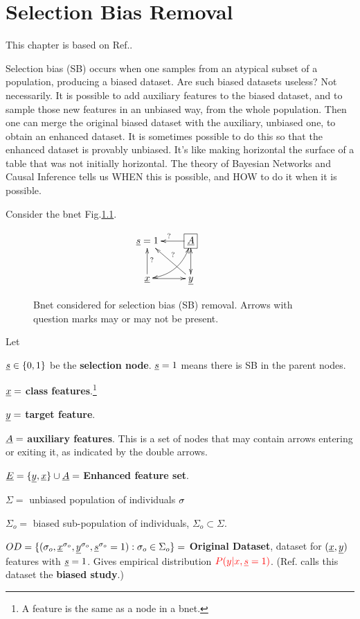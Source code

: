 \chapter{Selection Bias Removal}
\label{ch-sb-removal}
This chapter
is based on Ref.\cite{bare-sb-removal}.

Selection bias (SB)
occurs when one
samples from an
atypical subset
of a
population,
producing a biased dataset.
Are such biased
datasets
useless? Not necessarily.
It is possible to
add auxiliary features
to the biased dataset, and to
sample those new features
in an unbiased way,
 from the whole population.
Then
one can merge
the original
 biased dataset with the
auxiliary, unbiased one,
to obtain an enhanced dataset.
It is sometimes
possible to do this so that the enhanced
dataset is provably
unbiased.
It's like making horizontal
the surface of a table
 that was
 not initially
horizontal.
The theory of Bayesian Networks and Causal
Inference tells us
WHEN this is possible,
and HOW to do it
when it is possible.

Consider the bnet
Fig.\ref{fig-bs-removal-basic}.

\begin{figure}[h!]
$$
\xymatrix{
\rvs=1
&*+[F]{\rvA}\ar@{<->}[d]\ar[l]_?
&
\\
\rvx\ar[r]\ar[u]_?\ar@/_.9pc/@{<->}[ru]
&\rvy\ar[ul]_?
}
$$
\caption{Bnet considered for
selection bias (SB) removal.
Arrows with question marks
may or may not be present.}
\label{fig-bs-removal-basic}
\end{figure}

Let

${\underline{s}}\in\{0,1\}$
be the {\bf selection node}.
${\underline{s}}=1$ means there is
SB
in the parent nodes.


${\underline{x}}=$ {\bf class features}.\footnote{
A feature is the same as a node in a bnet.}

${\underline{y}}=$ {\bf target feature}.

${\underline{A}}=$ {\bf auxiliary features}.
This is a set of nodes that
may contain arrows entering
or exiting it, as indicated by the double arrows.

${\underline{E}}=\{{\underline{y}}, {\underline{x}}\}\cup{\underline{A}}=$
{\bf Enhanced feature set}.


$\Sigma=$ unbiased population of individuals $\sigma$

$\Sigma_o=$ biased sub-population of individuals,
$\Sigma_o\subset \Sigma$.

$OD=\{({\sigma_o},{\underline{x}}^{\sigma_o},  {\underline{y}}^{\sigma_o},{\underline{s}}^{\sigma_o}=1):{\sigma_o}\in\Sigma_o\}=$
{\bf Original Dataset}, dataset for $({\underline{x}},{\underline{y}})$ features
with ${\underline{s}}=1$.
Gives empirical
distribution $\color{red}{P(y|x, {\underline{s}}=1)}$.
(Ref.\cite{bare-sb-removal}
calls this dataset the {\bf biased study}.)

